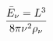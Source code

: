 \documentclass[preview]{standalone}
\begin{document}
\begin{align*}
\bar{E}_{\nu}=  L ^{3}  \over 8\pi\nu^{2}  \rho_{\nu}
\end{align*}
\end{document}
